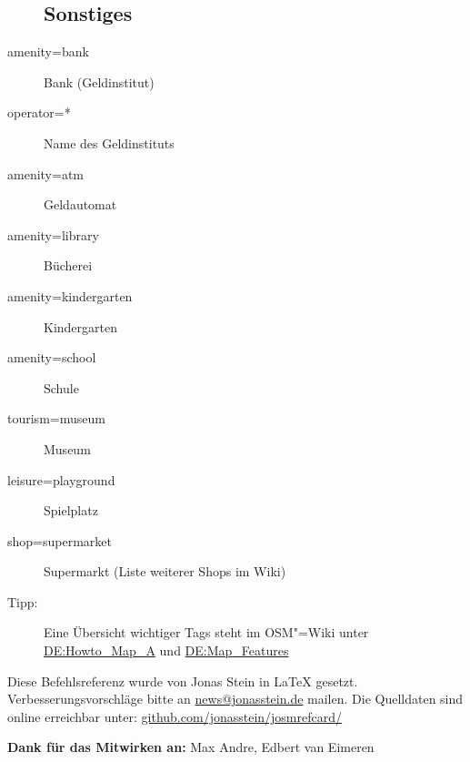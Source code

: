 \documentclass[a4paper,11pt,notumble]{leaflet}
\begin{document}
\begin{flushleft}
\begin{description}
\subsection*{Sonstiges}
\item[amenity=bank] Bank (Geldinstitut)
\item[operator=*] Name des Geldinstituts
\item[amenity=atm] Geldautomat
\item[amenity=library] Bücherei
\item[amenity=kindergarten] Kindergarten
\item[amenity=school] Schule
\item[tourism=museum] Museum
\item[leisure=playground] Spielplatz
\item[shop=supermarket] Supermarkt (Liste weiterer Shops im Wiki)
\\
\item[Tipp:] Eine Übersicht wichtiger Tags steht im OSM"=Wiki unter
\href{http://wiki.osm.org/wiki/DE:Howto_Map_A}{DE:Howto\_Map\_A} und
\href{http://wiki.openstreetmap.org/wiki/DE:Map_Features}{DE:Map\_Features}
\end{description}
\end{flushleft}




Diese Befehlsreferenz wurde von Jonas Stein in \LaTeX{} gesetzt.
Verbesserungsvorschläge bitte an \href{mailto:news@jonasstein.de}{news@jonasstein.de} mailen.
Die Quelldaten sind online erreichbar unter: 
\href{http://github.com/jonasstein/josmrefcard/}{github.com/jonasstein/josmrefcard/}

\textbf{Dank für das Mitwirken an:} Max Andre, Edbert van Eimeren
\end{document}
